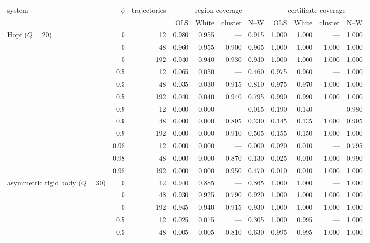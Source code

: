 \begin{table}[!htbp]
\centering\footnotesize
\begin{adjustbox}{max width=\textwidth, max totalheight=0.9\textheight}
\begin{tabular}{lrrrrrrrrrr}
\toprule
system & $\phi$ & trajectories & \multicolumn{4}{c}{region coverage} & \multicolumn{4}{c}{certificate coverage} \\
\cmidrule(lr){4-7}\cmidrule(lr){8-11}
 & & & OLS & White & cluster & N--W & OLS & White & cluster & N--W \\
\midrule
Hopf ($Q = 20$) & 0 & 12 & 0.980 & 0.955 & --- & 0.915 & 1.000 & 1.000 & --- & 1.000 \\
 & 0 & 48 & 0.960 & 0.955 & 0.900 & 0.965 & 1.000 & 1.000 & 1.000 & 1.000 \\
 & 0 & 192 & 0.940 & 0.940 & 0.930 & 0.940 & 1.000 & 1.000 & 1.000 & 1.000 \\
 & 0.5 & 12 & 0.065 & 0.050 & --- & 0.460 & 0.975 & 0.960 & --- & 1.000 \\
 & 0.5 & 48 & 0.035 & 0.030 & 0.915 & 0.810 & 0.975 & 0.970 & 1.000 & 1.000 \\
 & 0.5 & 192 & 0.040 & 0.040 & 0.940 & 0.795 & 0.990 & 0.990 & 1.000 & 1.000 \\
 & 0.9 & 12 & 0.000 & 0.000 & --- & 0.015 & 0.190 & 0.140 & --- & 0.980 \\
 & 0.9 & 48 & 0.000 & 0.000 & 0.895 & 0.330 & 0.145 & 0.135 & 1.000 & 0.995 \\
 & 0.9 & 192 & 0.000 & 0.000 & 0.910 & 0.505 & 0.155 & 0.150 & 1.000 & 1.000 \\
 & 0.98 & 12 & 0.000 & 0.000 & --- & 0.000 & 0.020 & 0.010 & --- & 0.795 \\
 & 0.98 & 48 & 0.000 & 0.000 & 0.870 & 0.130 & 0.025 & 0.010 & 1.000 & 0.990 \\
 & 0.98 & 192 & 0.000 & 0.000 & 0.950 & 0.470 & 0.010 & 0.010 & 1.000 & 1.000 \\
\addlinespace
asymmetric rigid body ($Q = 30$) & 0 & 12 & 0.940 & 0.885 & --- & 0.865 & 1.000 & 1.000 & --- & 1.000 \\
 & 0 & 48 & 0.930 & 0.925 & 0.790 & 0.920 & 1.000 & 1.000 & 1.000 & 1.000 \\
 & 0 & 192 & 0.945 & 0.940 & 0.915 & 0.930 & 1.000 & 1.000 & 1.000 & 1.000 \\
 & 0.5 & 12 & 0.025 & 0.015 & --- & 0.305 & 1.000 & 0.995 & --- & 1.000 \\
 & 0.5 & 48 & 0.005 & 0.005 & 0.810 & 0.630 & 0.995 & 0.995 & 1.000 & 1.000 \\

\end{tabular}
\end{adjustbox}
\end{table}
